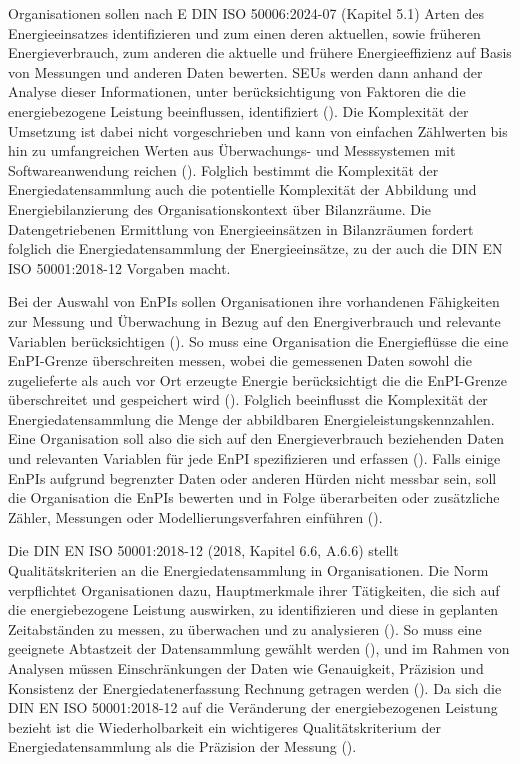 Organisationen sollen nach E DIN ISO 50006:2024-07 (Kapitel 5.1) Arten des Energieeinsatzes identifizieren und zum einen deren aktuellen, sowie früheren 
Energieverbrauch, zum anderen die aktuelle und frühere Energieeffizienz auf Basis von Messungen und anderen Daten bewerten. 
SEUs werden dann anhand der Analyse dieser Informationen, unter berücksichtigung von Faktoren die die energiebezogene Leistung beeinflussen, 
identifiziert (\cite[Kapitel 5.1]{DIN50006.2024}). 
Die Komplexität der Umsetzung ist dabei nicht vorgeschrieben und kann von einfachen Zählwerten bis hin zu umfangreichen Werten aus Überwachungs- und Messsystemen mit
Softwareanwendung reichen (\cite[S. 36]{DIN50001.2018}).
Folglich bestimmt die Komplexität der Energiedatensammlung auch die potentielle Komplexität der Abbildung und Energiebilanzierung 
des Organisationskontext über Bilanzräume. 
Die Datengetriebenen Ermittlung von Energieeinsätzen in Bilanzräumen fordert folglich die Energiedatensammlung der Energieeinsätze, 
zu der auch die DIN EN ISO 50001:2018-12 Vorgaben macht.

Bei der Auswahl von EnPIs sollen Organisationen ihre vorhandenen Fähigkeiten zur Messung und Überwachung in Bezug auf den 
Energiverbrauch und relevante Variablen berücksichtigen (\cite[S. 21]{DIN50006.2024}).
So muss eine Organisation die Energieflüsse die eine EnPI-Grenze überschreiten messen, wobei die gemessenen Daten sowohl die 
zugelieferte als auch vor Ort erzeugte Energie berücksichtigt die die EnPI-Grenze überschreitet und gespeichert wird (\cite[S. 17]{DIN50006.2024}).
Folglich beeinflusst die Komplexität der Energiedatensammlung die Menge der abbildbaren Energieleistungskennzahlen. 
Eine Organisation soll also die sich auf den Energieverbrauch beziehenden Daten und relevanten Variablen für jede EnPI spezifizieren und erfassen (\cite[S. 18]{DIN50006.2024}).
Falls einige EnPIs aufgrund begrenzter Daten oder anderen Hürden nicht messbar sein, soll die Organisation die EnPIs bewerten und in Folge überarbeiten oder 
zusätzliche Zähler, Messungen oder Modellierungsverfahren einführen (\cite[S. 18]{DIN50006.2024}).

Die DIN EN ISO 50001:2018-12 (2018, Kapitel 6.6, A.6.6) stellt Qualitätskriterien an die Energiedatensammlung in Organisationen.
Die Norm verpflichtet Organisationen dazu, Hauptmerkmale ihrer Tätigkeiten, die sich auf die energiebezogene Leistung auswirken, zu identifizieren und diese in geplanten
Zeitabständen zu messen, zu überwachen und zu analysieren (\cite[S. 23]{DIN50001.2018}).
So muss eine geeignete Abtastzeit der Datensammlung gewählt werden (\cite[S. 20]{DIN50006.2024}), und im Rahmen von Analysen müssen Einschränkungen der Daten 
wie Genauigkeit, Präzision und Konsistenz der Energiedatenerfassung Rechnung getragen werden (\cite[S. 37]{DIN50001.2018}).  
Da sich die DIN EN ISO 50001:2018-12 auf die Veränderung der energiebezogenen Leistung bezieht ist die Wiederholbarkeit ein wichtigeres Qualitätskriterium der 
Energiedatensammlung als die Präzision der Messung (\cite[S. 3]{Szajdzicki.2017}).
